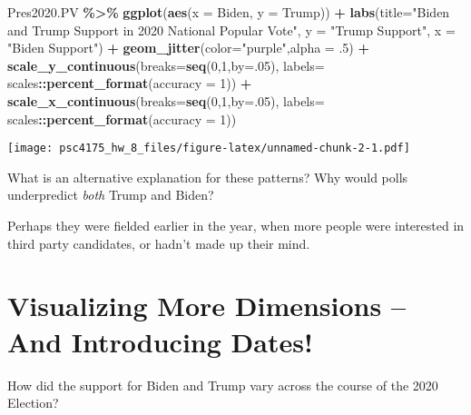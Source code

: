\documentclass[
]{article}
\newenvironment{Shaded}{\begin{snugshade}}{\end{snugshade}}
\newcommand{\AttributeTok}[1]{\textcolor[rgb]{0.13,0.29,0.53}{#1}}
\newcommand{\DecValTok}[1]{\textcolor[rgb]{0.00,0.00,0.81}{#1}}
\newcommand{\FunctionTok}[1]{\textcolor[rgb]{0.13,0.29,0.53}{\textbf{#1}}}
\newcommand{\NormalTok}[1]{#1}
\newcommand{\SpecialCharTok}[1]{\textcolor[rgb]{0.81,0.36,0.00}{\textbf{#1}}}
\newcommand{\StringTok}[1]{\textcolor[rgb]{0.31,0.60,0.02}{#1}}
\begin{document}
\begin{Shaded}
\begin{Highlighting}[]
\NormalTok{Pres2020.PV }\SpecialCharTok{\%\textgreater{}\%}
  \FunctionTok{ggplot}\NormalTok{(}\FunctionTok{aes}\NormalTok{(}\AttributeTok{x =}\NormalTok{ Biden, }\AttributeTok{y =}\NormalTok{ Trump)) }\SpecialCharTok{+} 
  \FunctionTok{labs}\NormalTok{(}\AttributeTok{title=}\StringTok{"Biden and Trump Support in 2020 National Popular Vote"}\NormalTok{,}
       \AttributeTok{y =} \StringTok{"Trump Support"}\NormalTok{,}
       \AttributeTok{x =} \StringTok{"Biden Support"}\NormalTok{) }\SpecialCharTok{+} 
  \FunctionTok{geom\_jitter}\NormalTok{(}\AttributeTok{color=}\StringTok{"purple"}\NormalTok{,}\AttributeTok{alpha =}\NormalTok{ .}\DecValTok{5}\NormalTok{) }\SpecialCharTok{+} 
    \FunctionTok{scale\_y\_continuous}\NormalTok{(}\AttributeTok{breaks=}\FunctionTok{seq}\NormalTok{(}\DecValTok{0}\NormalTok{,}\DecValTok{1}\NormalTok{,}\AttributeTok{by=}\NormalTok{.}\DecValTok{05}\NormalTok{),}
                     \AttributeTok{labels=}\NormalTok{ scales}\SpecialCharTok{::}\FunctionTok{percent\_format}\NormalTok{(}\AttributeTok{accuracy =} \DecValTok{1}\NormalTok{)) }\SpecialCharTok{+}
  \FunctionTok{scale\_x\_continuous}\NormalTok{(}\AttributeTok{breaks=}\FunctionTok{seq}\NormalTok{(}\DecValTok{0}\NormalTok{,}\DecValTok{1}\NormalTok{,}\AttributeTok{by=}\NormalTok{.}\DecValTok{05}\NormalTok{),}
                     \AttributeTok{labels=}\NormalTok{ scales}\SpecialCharTok{::}\FunctionTok{percent\_format}\NormalTok{(}\AttributeTok{accuracy =} \DecValTok{1}\NormalTok{)) }
\end{Highlighting}
\end{Shaded}

\texttt{[image: psc4175\_hw\_8\_files/figure-latex/unnamed-chunk-2-1.pdf]}

What is an alternative explanation for these patterns? Why would polls
underpredict \emph{both} Trump and Biden?

Perhaps they were fielded earlier in the year, when more people were
interested in third party candidates, or hadn't made up their mind.

\section{Visualizing More Dimensions -- And Introducing
Dates!}\label{visualizing-more-dimensions-and-introducing-dates}

How did the support for Biden and Trump vary across the course of the
2020 Election?
\end{document}
